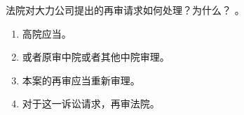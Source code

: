 \begin{enumerate}
\begin{kk}{法院对大力公司提出的再审请求如何处理？为什么？}
          。
          \begin{enumerate}
            \item 高院应当。
            \item {}或者原审中院或者其他中院审理。
            \item 本案的再审应当重新审理。
            \item 对于这一诉讼请求，再审法院。
          \end{enumerate}
        \end{kk}
\end{enumerate}
